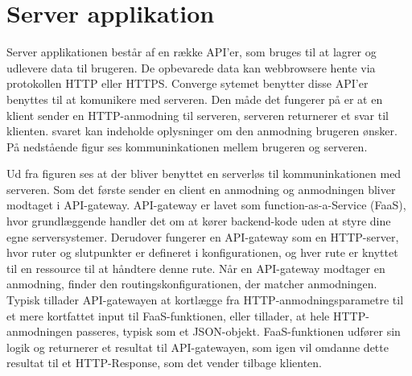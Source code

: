 \section{Server applikation}
Server applikationen består af en række API’er, som bruges til at lagrer og udlevere data til brugeren. De opbevarede data kan webbrowsere hente via protokollen HTTP eller HTTPS. 
Converge sytemet benytter disse API’er benyttes til at komunikere med serveren. Den måde det fungerer på er at en klient sender en HTTP-anmodning til serveren, serveren returnerer et svar til klienten. svaret kan indeholde oplysninger om den anmodning brugeren ønsker. På nedstående figur ses kommuninkationen mellem brugeren og serveren.


Ud fra figuren ses at der bliver benyttet en serverløs til kommuninkationen med serveren. Som det første sender en client en anmodning og anmodningen bliver modtaget i API-gateway. API-gateway er lavet som function-as-a-Service (FaaS), hvor grundlæggende handler det om at kører backend-kode uden at styre dine egne serversystemer.
Derudover fungerer en API-gateway som en HTTP-server, hvor ruter og slutpunkter er defineret i konfigurationen, og hver rute er knyttet til en ressource til at håndtere denne rute. Når en API-gateway modtager en anmodning, finder den routingskonfigurationen, der matcher anmodningen. Typisk tillader API-gatewayen at kortlægge fra HTTP-anmodningsparametre til et mere kortfattet input til FaaS-funktionen, eller tillader, at hele HTTP-anmodningen passeres, typisk som et JSON-objekt. FaaS-funktionen udfører sin logik og returnerer et resultat til API-gatewayen, som igen vil omdanne dette resultat til et HTTP-Response, som det vender tilbage klienten.


